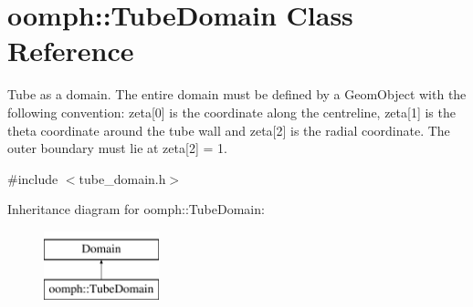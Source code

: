 \hypertarget{classoomph_1_1TubeDomain}{}\section{oomph\+:\+:Tube\+Domain Class Reference}
\label{classoomph_1_1TubeDomain}


Tube as a domain. The entire domain must be defined by a Geom\+Object with the following convention\+: zeta\mbox{[}0\mbox{]} is the coordinate along the centreline, zeta\mbox{[}1\mbox{]} is the theta coordinate around the tube wall and zeta\mbox{[}2\mbox{]} is the radial coordinate. The outer boundary must lie at zeta\mbox{[}2\mbox{]} = 1.  




{\ttfamily \#include $<$tube\+\_\+domain.\+h$>$}

Inheritance diagram for oomph\+:\+:Tube\+Domain\+:\begin{figure}[H]
\begin{center}
\leavevmode
\includegraphics[height=2.000000cm]{classoomph_1_1TubeDomain}
\end{center}
\end{figure}
